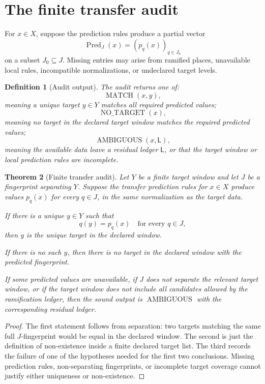 \documentclass[11pt]{article}
\newtheorem{theorem}{Theorem}[section]
\newtheorem{definition}[theorem]{Definition}
\DeclareMathOperator{\MATCH}{MATCH}
\DeclareMathOperator{\NOTARGET}{NO\_TARGET}
\DeclareMathOperator{\AMBIGUOUS}{AMBIGUOUS}
\begin{document}
\section{The finite transfer audit}

For \(x\in X\), suppose the prediction rules produce a partial vector
\[
\operatorname{Pred}_J(x)=(p_q(x))_{q\in J_0}
\]
on a subset \(J_0\subseteq J\).  Missing entries may arise from ramified places, unavailable local rules, incompatible normalizations, or undeclared target levels.

\begin{definition}[Audit output]
The audit returns one of:
\[
\MATCH(x,y),
\]
meaning a unique target \(y\in Y\) matches all required predicted values;
\[
\NOTARGET(x),
\]
meaning no target in the declared target window matches the required predicted values;
\[
\AMBIGUOUS(x,\mathsf L),
\]
meaning the available data leave a residual ledger \(\mathsf L\), or that the target window or local prediction rules are incomplete.
\end{definition}

\begin{theorem}[Finite transfer audit]
Let \(Y\) be a finite target window and let \(J\) be a fingerprint separating \(Y\).  Suppose the transfer prediction rules for \(x\in X\) produce values \(p_q(x)\) for every \(q\in J\), in the same normalization as the target data.

If there is a unique \(y\in Y\) such that
\[
q(y)=p_q(x)
\quad\text{for every }q\in J,
\]
then \(y\) is the unique target in the declared window.

If there is no such \(y\), then there is no target in the declared window with the predicted fingerprint.

If some predicted values are unavailable, if \(J\) does not separate the relevant target window, or if the target window does not include all candidates allowed by the ramification ledger, then the sound output is \(\AMBIGUOUS\) with the corresponding residual ledger.
\end{theorem}

\begin{proof}
The first statement follows from separation: two targets matching the same full \(J\)-fingerprint would be equal in the declared window.  The second is just the definition of non-existence inside a finite declared target list.  The third records the failure of one of the hypotheses needed for the first two conclusions.  Missing prediction rules, non-separating fingerprints, or incomplete target coverage cannot justify either uniqueness or non-existence.
\end{proof}
\end{document}
